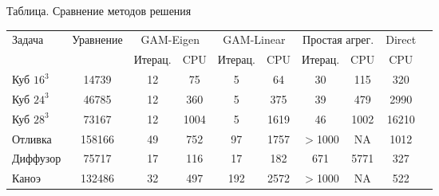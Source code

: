 \begin{center}


Таблица. Сравнение методов решения


\medskip





\begin{tabular}{|l|c|c|c|c|c|c|c|c|c|}


\hline


Задача & Уравнение &


\multicolumn{2}{|c|}{GAM-Eigen}&


\multicolumn{2}{|c|}{GAM-Linear}&


\multicolumn{2}{|c|}{Простая агрег.}& Direct\\


\cline{3-8}


&&Итерац.& CPU & Итерац.& CPU & Итерац. & CPU & CPU\\


\hline


Куб $16^3$ & 14739& 12&  75&  5&  64& 30&   115&  320\\


Куб $24^3$ & 46785& 12& 360&  5& 375& 39&   479& 2990\\


Куб $28^3$ & 73167& 12& 1004&  5& 1619& 46&  1002& 16210\\


Отливка   & 158166& 49& 752& 97& 1757& $>$1000& NA& 1012\\


Диффузор  & 75717& 17& 116& 17& 182& 671&  5771&  327\\


Каноэ    & 132486& 32& 497& 192& 2572& $>$1000& NA&  522\\


\hline


\end{tabular}


\end{center}





